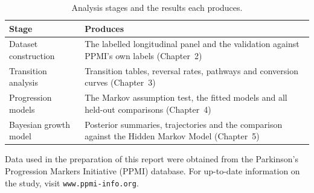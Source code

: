 \documentclass[11pt,a4paper]{article}
\begin{document}
\begin{table}[H]
\centering
\begin{tabular}{@{}lp{9.2cm}@{}}
\toprule
\textbf{Stage} & \textbf{Produces} \\
\midrule
Dataset construction  & The labelled longitudinal panel and the validation
                        against PPMI's own labels (Chapter~2) \\
Transition analysis   & Transition tables, reversal rates, pathways and
                        conversion curves (Chapter~3) \\
Progression models    & The Markov assumption test, the fitted models and all
                        held-out comparisons (Chapter~4) \\
Bayesian growth model & Posterior summaries, trajectories and the comparison
                        against the Hidden Markov Model (Chapter~5) \\
\bottomrule
\end{tabular}
\caption{Analysis stages and the results each produces.}
\end{table}

\vspace{1em}
\noindent
\small
Data used in the preparation of this report were obtained from the Parkinson's
Progression Markers Initiative (PPMI) database. For up-to-date information on
the study, visit \texttt{www.ppmi-info.org}.
\end{document}
